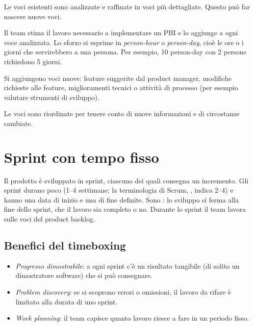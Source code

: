 \begin{description}[leftmargin=0pt, style=unboxed]
  \item[Refinement.] Le voci esistenti sono analizzate e raffinate in voci più dettagliate. Questo può far nascere
    nuove voci.
  \item[Estimation.] Il team stima il lavoro necessario a implementare un PBI e lo aggiunge a ogni voce analizzata.
    Lo sforzo si esprime in \emph{person-hour} o \emph{person-day}, cioè le ore o i giorni che servirebbero a una
    persona. Per esempio, 10 person-day con 2 persone richiedono 5 giorni.
  \item[Creation.] Si aggiungono voci nuove: feature suggerite dal product manager, modifiche richieste alle feature,
    miglioramenti tecnici o attività di processo (per esempio valutare strumenti di sviluppo).
  \item[Prioritization.] Le voci sono riordinate per tenere conto di nuove informazioni e di circostanze cambiate.
\end{description}

\section{Sprint con tempo fisso}
\label{sec:agile-sprint}

Il prodotto è sviluppato in sprint, ciascuno dei quali consegna un incremento. Gli sprint durano poco (1--4
settimane; la terminologia di Scrum, , indica 2--4) e hanno una data di inizio e una di fine definite. Sono : lo sviluppo si ferma alla
fine dello sprint, che il lavoro sia completo o no. Durante lo sprint il team lavora sulle voci del product backlog.

\subsection*{Benefici del timeboxing}

\begin{itemize}
  \item \emph{Progresso dimostrabile}: a ogni sprint c'è un risultato tangibile (di solito un dimostratore
    software) che si può consegnare.
  \item \emph{Problem discovery}: se si scoprono errori o omissioni, il lavoro da rifare è limitato alla durata di
    uno sprint.
  \item \emph{Work planning}: il team capisce quanto lavoro riesce a fare in un periodo fisso.
\end{itemize}

